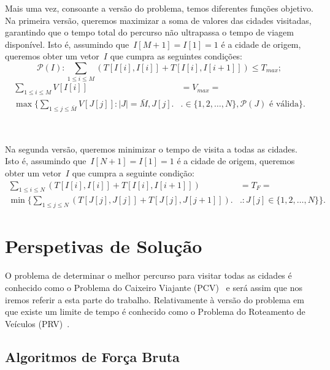 \documentclass[12pt,a4paper,reqno]{report}
\numberwithin{figure}{section}
\numberwithin{equation}{section}
\begin{document}
Mais uma vez, consoante a versão do problema, temos diferentes funções objetivo. Na primeira versão, queremos maximizar a soma de valores das cidades visitadas, garantindo que o tempo total do percurso não ultrapassa o tempo de viagem disponível. Isto é, assumindo que~$I[M+1] = I[1] = 1$ é a cidade de origem, queremos obter um vetor~$I$ que cumpra as seguintes condições:
\begin{equation}
		\mathscr{P}(I): \sum_{1 \leq i \leq M} (T[I[i],I[i]] + T[I[i],I[i+1]]) \leq T_{max};
\end{equation}
\begin{equation}
	\begin{split}
		\sum_{1 \leq i \leq M} V[I[i]] & = V_{max} = \\
		\max \Bigg\{\sum_{1 \leq j \leq \bar{M}} V[J[j]] : |J| = \bar{M}, J[j] \Bigg. & \Bigg. \in \{1, 2, \ldots, N\}, \mathscr{P}(J) \text{ é válida}\Bigg\}.
	\end{split}
\end{equation}

\
\

Na segunda versão, queremos minimizar o tempo de visita a todas as cidades. Isto é, assumindo que~$I[N+1] = I[1] = 1$ é a cidade de origem, queremos obter um vetor~$I$ que cumpra a seguinte condição:
\begin{equation}
	\begin{split}
		\sum_{1 \leq i \leq N} (T[I[i],I[i]] + T[I[i],I[i+1]]) & = T_F = \\
		\min \Bigg\{\sum_{1 \leq j \leq N} (T[J[j],J[j]] + T[J[j],J[j+1]]) \Bigg. & \Bigg. : J[j] \in \{1, 2, \ldots, N\}\Bigg\}.
	\end{split}
\end{equation}


\chapter{Perspetivas de Solução}

O problema de determinar o melhor percurso para visitar todas as cidades é conhecido como o Problema do Caixeiro Viajante (PCV)~\cite{wiki_tsp} e será assim que nos iremos referir a esta parte do trabalho. Relativamente à versão do problema em que existe um limite de tempo é conhecido como o Problema do Roteamento de Veículos (PRV)~\cite{wiki_vrp}.

\section{Algoritmos de Força Bruta}
\end{document}
